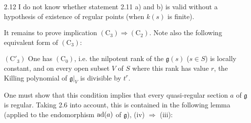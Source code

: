 \begin{remark}{2.12}\label{XIV.2.12}
I do not know whether statement 2.11 a) and b) is valid without a
hypothesis of existence of regular points (when $k(s)$ is finite).
\end{remark}
It remains to prove implication $(\mathrm C_3)\Rightarrow(\mathrm C_2)$.
Note also the following equivalent form of $(\mathrm C_3)$:

\noindent $(\mathrm C'_3)$ One has $(\mathrm C_0)$, i.e. the nilpotent
rank of the $\mathfrak g(s)$ ($s\in S$) is locally constant, and on
every open subset $V$ of $S$ where this rank has value $r$, the Killing
polynomial of $\mathfrak g|_V$ is divisible by $t^r$.

One must show that this condition implies that every quasi-regular
section $a$ of $\mathfrak g$ is regular. Taking 2.6 into account,
this is contained in the following lemma (applied to the endomorphism
$\operatorname{ad}(a)$ of $\mathfrak g$), (iv) $\Rightarrow$ (iii):

